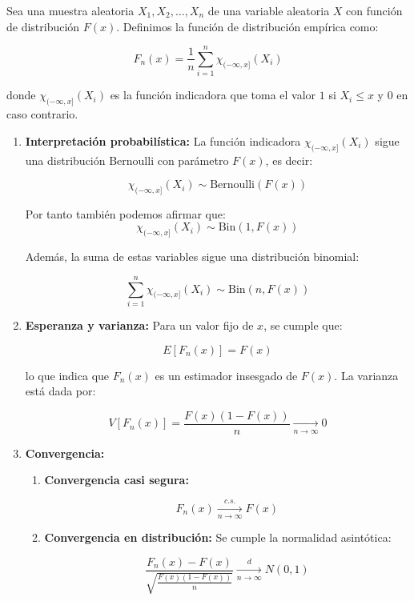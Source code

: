 \begin{proposición}
Sea una muestra aleatoria \( X_1, X_2, \dots, X_n \) de una variable aleatoria \( X \) con función de distribución \( F(x) \). Definimos la función de distribución empírica como:

$$
	F_n(x) = \frac{1}{n} \sum_{i=1}^{n} \chi_{(-\infty,x]}(X_i)
$$

donde \( \chi_{(-\infty,x]}(X_i) \) es la función indicadora que toma el valor
\( 1 \) si \( X_i \leq x \) y \( 0 \) en caso contrario.

\begin{enumerate}
	\item \textbf{Interpretación probabilística:}
	      La función indicadora \( \chi_{(-\infty,x]}(X_i) \) sigue una distribución Bernoulli con parámetro \( F(x) \), es decir:

	      $$
		      \chi_{(-\infty,x]}(X_i) \sim \text{Bernoulli}(F(x))
	      $$

	      Por tanto también podemos afirmar que: $$\chi_{(-\infty,x]}(X_i) \sim
		      \text{Bin}(1, F(x))$$

	      Además, la suma de estas variables sigue una distribución binomial:

	      $$ \sum_{i=1}^{n} \chi_{(-\infty,x]}(X_i) \sim \text{Bin}(n, F(x)) $$
	\item \textbf{Esperanza y varianza:}
	      Para un valor fijo de \( x \), se cumple que:

	      $$ E[F_n(x)] = F(x) $$

	      lo que indica que \( F_n(x) \) es un estimador insesgado de \( F(x) \). La
	      varianza está dada por:

	      $$ V[F_n(x)] = \frac{F(x)(1 - F(x))}{n} \underset{n \to \infty}{\longrightarrow} 0 $$

	\item \textbf{Convergencia:}
	      \begin{enumerate}
		      \item \textbf{Convergencia casi segura:}

		            $$ F_n(x) \underset{n \to \infty}{\xrightarrow{c.s.}} F(x) $$

		      \item \textbf{Convergencia en distribución:}
		            Se cumple la normalidad asintótica:

		            $$ \frac{F_n(x) - F(x)}{\sqrt{\frac{F(x)(1-F(x))}{n}}} \underset{n \to \infty}{\xrightarrow{d}} N(0,1) $$


\end{enumerate}
\end{enumerate}
\end{proposición}
